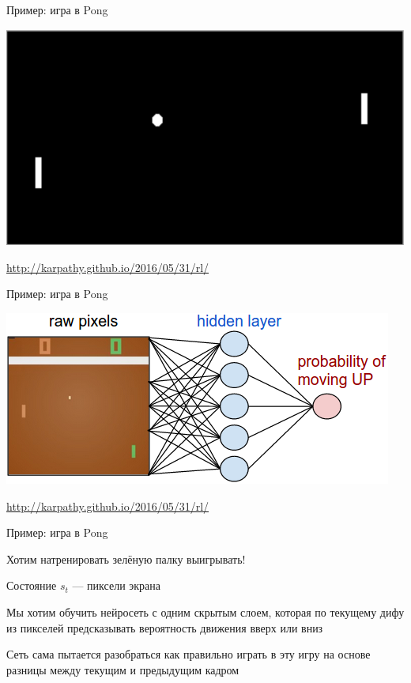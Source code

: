\documentclass[notes,12pt, aspectratio=169]{beamer}
\newenvironment{wideitemize}{\itemize\addtolength{\itemsep}{10pt}}{\enditemize}
\begin{document}
\begin{frame}{Пример: игра в Pong}
\begin{center}
	\includegraphics[width=.8\linewidth]{pong.png}
\end{center}
\vfill
{\color{blue}  \url{http://karpathy.github.io/2016/05/31/rl/}}
\end{frame}


\begin{frame}{Пример: игра в Pong}
\begin{center}
	\includegraphics[width=.6\linewidth]{pong_NN.png}
\end{center}
\vfill
{\color{blue}  \url{http://karpathy.github.io/2016/05/31/rl/}}
\end{frame}


\begin{frame}{Пример: игра в Pong}
\begin{wideitemize}
	\item  Хотим натренировать зелёную палку выигрывать! 
	
	\item  Состояние $s_t$ — пиксели экрана
	
	\item Мы хотим обучить нейросеть с одним скрытым слоем, которая по текущему дифу из пикселей предсказывать вероятность движения вверх или вниз 
	
	\item Сеть сама пытается разобраться как правильно играть в эту игру на основе разницы между текущим и предыдущим кадром 
\end{wideitemize}
\end{frame}
\end{document}
